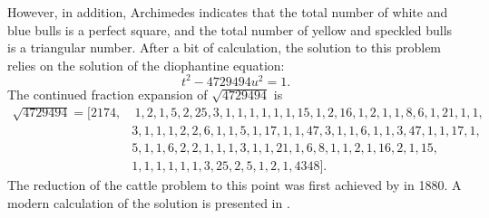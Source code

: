 However, in addition, Archimedes indicates that the total number of
white and blue bulls is a perfect square, and the total number of
yellow and speckled bulls is a triangular number.  After a bit of
calculation, the solution to this problem relies on the solution of
the diophantine equation:
\[
t^2 - 4729494 u^2 = 1.
\]
The continued fraction expansion of $\sqrt{4729494}$ is
\[
\begin{aligned}
\sqrt{4729494} = 
[2174,&~1, 2, 1, 5, 2, 25, 3, 1, 1, 1, 1, 1, 1, 15, 1, 2, 16, 1, 2, 1,
1, 8, 6, 1, 21, 1, 1, \\
&3, 1, 1, 1, 2, 2, 6, 1, 1, 5, 1, 17, 1, 1, 47, 3, 1, 1, 6, 1, 1, 3,
  47, 1, 1, 17,1, \\ 
&5, 1, 1, 6, 2, 2, 1, 1, 1, 3, 1, 1, 21, 1, 6, 8, 1, 1, 2, 1, 16, 2,
  1, 15, \\
& 1, 1, 1, 1, 1, 1, 3, 25, 2, 5, 1, 2, 1, 4348]. 
\end{aligned}
\]
The reduction of the cattle problem to this point was first achieved
by {\Amthor} \cite{Amthor80} in 1880.  A modern calculation of the
solution is presented in \cite{Williams65}.

\normalsize

